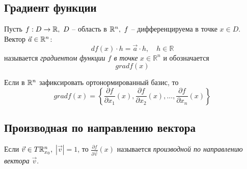 \subsection{Градиент функции}

\begin{definition}
    Пусть $f:D\rightarrow \mathbb{R}, \ D$ -- область в $\mathbb{R}^n, \ f$ -- дифференцируема в точке $x \in D$. Вектор $\vec{a} \in \mathbb{R}^n$:
    \[
        df(x)\cdot h = \vec{a} \cdot h, \quad h \in \mathbb{R}
    \]
    называется \emph{градиентом функции $f$ в точке} $x \in \mathbb{R}^n$ и обозначается
    \[
        gradf(x)
    \]

    Если в $\mathbb{R}^n$ зафиксировать ортонормированный базис, то
    \[
        gradf(x) = \left\{\frac{\partial f}{\partial x_1}(x),\frac{\partial f}{\partial x_2}(x),\ldots,\frac{\partial f}{\partial x_n}(x)\right\}
    \]
\end{definition}

\subsection{Производная по направлению вектора}

\begin{definition}
    Если $ \vec{v}\in T\mathbb{R}_{x_0}^n, $ $ |\vec{v}| = 1 $, то $ \frac{\partial f}{\partial \vec{v}}(x) $ называется \emph{производной по направлению вектора} $ \vec{v} $.
\end{definition}